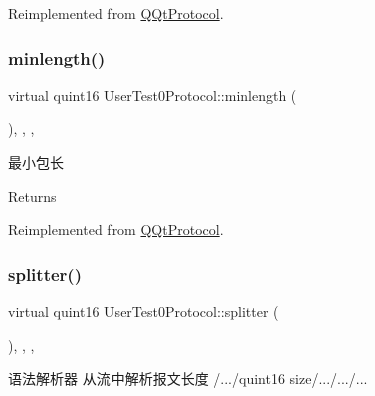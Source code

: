 Reimplemented from \mbox{\hyperlink{class_q_qt_protocol_af41bc3116abbbcfc9af45e151a253ff7}{Q\+Qt\+Protocol}}.

\mbox{\label{class_user_test0_protocol_acc05bdd36b7c126ee95eaf3c8ce7099a}} 
\subsubsection{\texorpdfstring{minlength()}{minlength()}}
{\footnotesize\ttfamily virtual quint16 User\+Test0\+Protocol\+::minlength (\begin{DoxyParamCaption}{ }\end{DoxyParamCaption})\hspace{0.3cm}{\ttfamily [inline]}, {\ttfamily [override]}, {\ttfamily [protected]}, {\ttfamily [virtual]}}



最小包长 

\begin{DoxyReturn}{Returns}

\end{DoxyReturn}


Reimplemented from \mbox{\hyperlink{class_q_qt_protocol_a2b00f53d3dd0eed817eeecff422891f3}{Q\+Qt\+Protocol}}.

\mbox{\label{class_user_test0_protocol_ace8b232173e7e37761c739efed42d2e4}} 
\subsubsection{\texorpdfstring{splitter()}{splitter()}}
{\footnotesize\ttfamily virtual quint16 User\+Test0\+Protocol\+::splitter (\begin{DoxyParamCaption}\item[{const Q\+Byte\+Array \&}]{ }\end{DoxyParamCaption})\hspace{0.3cm}{\ttfamily [inline]}, {\ttfamily [override]}, {\ttfamily [protected]}, {\ttfamily [virtual]}}



语法解析器 从流中解析报文长度 /.../quint16 size/.../.../... 



